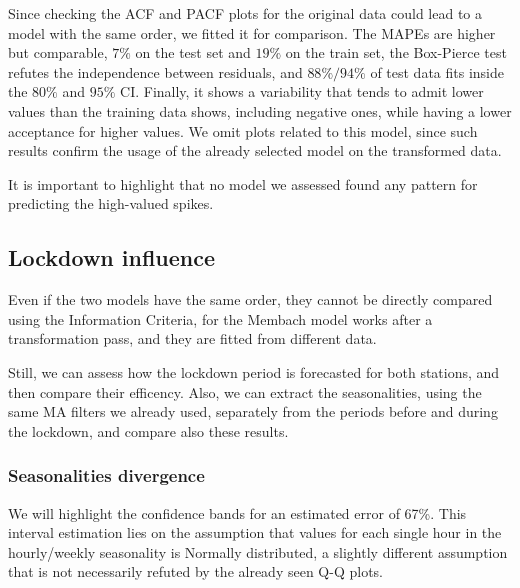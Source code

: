 \documentclass[12pt]{article}
\begin{document}
Since checking the ACF and PACF plots for the original data could lead to a model with the same order, we fitted it for comparison. The MAPEs are higher but comparable, $7\%$ on the test set and $19\%$ on the train set, the Box-Pierce test refutes the independence between residuals, and $88\%/94\%$ of test data fits inside the $80\%$ and $95\%$ CI. Finally, it shows a variability that tends to admit lower values than the training data shows, including negative ones, while having a lower acceptance for higher values. We omit plots related to this model, since such results confirm the usage of the already selected model on the transformed data.

It is important to highlight that no model we assessed found any pattern for predicting the high-valued spikes.

\subsection{Lockdown influence}
Even if the two models have the same order, they cannot be directly compared using the Information Criteria, for the Membach model works after a transformation pass, and they are fitted from different data.

Still, we can assess how the lockdown period is forecasted for both stations, and then compare their efficency. Also, we can extract the seasonalities, using the same MA filters we already used, separately from the periods before and during the lockdown, and compare also these results.

\subsubsection{Seasonalities divergence}
We will highlight the confidence bands for an estimated error of 67\%. This interval estimation lies on the assumption that values for each single hour in the hourly/weekly seasonality is Normally distributed, a slightly different assumption that is not necessarily refuted by the already seen Q-Q plots.
\end{document}
